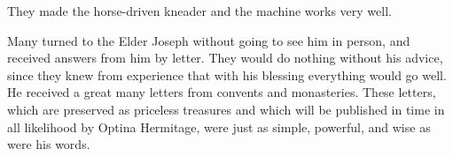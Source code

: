 They made the horse-driven kneader and the machine works very well.

Many turned to the Elder Joseph without going to see him in person, and received answers from him by letter. They would do nothing without his advice, since they knew from experience that with his blessing everything would go well. He received a great many letters from convents and monasteries. These letters, which are preserved as priceless treasures and which will be published in time in all likelihood by Optina Hermitage, were just as simple, powerful, and wise as were his words.
